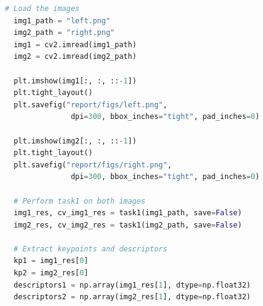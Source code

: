 \documentclass[11pt,a4paper]{article}
\begin{document}
\begin{lstlisting}[language=Python, caption=Loading images and applying SIFT]
  # Load the images
  img1_path = "left.png"
  img2_path = "right.png"
  img1 = cv2.imread(img1_path)
  img2 = cv2.imread(img2_path)

  plt.imshow(img1[:, :, ::-1])
  plt.tight_layout()
  plt.savefig("report/figs/left.png",
               dpi=300, bbox_inches="tight", pad_inches=0)
  
  plt.imshow(img2[:, :, ::-1])
  plt.tight_layout()
  plt.savefig("report/figs/right.png",
               dpi=300, bbox_inches="tight", pad_inches=0)

  # Perform task1 on both images
  img1_res, cv_img1_res = task1(img1_path, save=False)
  img2_res, cv_img2_res = task1(img2_path, save=False)

  # Extract keypoints and descriptors
  kp1 = img1_res[0]
  kp2 = img2_res[0]
  descriptors1 = np.array(img1_res[1], dtype=np.float32)
  descriptors2 = np.array(img2_res[1], dtype=np.float32)
\end{lstlisting} 
\end{document}
